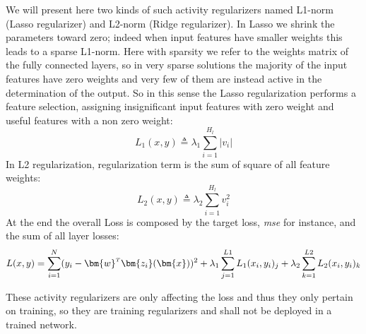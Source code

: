 We will present here two kinds of such activity regularizers named L1-norm (Lasso regularizer) and L2-norm (Ridge regularizer).
In Lasso we shrink the parameters toward zero; indeed when input features have smaller weights this leads to a sparse L1-norm. Here with sparsity we refer to the weights matrix of the fully connected layers, so in very sparse solutions the majority of the input features have zero weights and very few of them are instead active in the determination of the output.
So in this sense the Lasso regularization performs a feature selection, assigning insignificant input features with zero weight and useful features with a non zero weight:
\begin{equation}
    L_1(x,y) \triangleq \lambda_1 \sum_{i=1}^{H_l} \left| v_i \right|
\end{equation}
In L2 regularization, regularization term is the sum of square of all feature weights:
\begin{equation}
    L_2(x,y) \triangleq \lambda_2 \sum_{i=1}^{H_l} v_i^2
\end{equation}
At the end the overall Loss is composed by the target loss, \textit{mse} for instance, and the sum of all layer losses:
\begin{equation}
    L(x,y) = \sum_{i=1}^N (y_i - \transpose{\bm{w}}\bm{z_i}(\bm{x}))^2 + \lambda_1 \sum_{j=1}^{L1} L_1(x_i,y_i)_j + \lambda_2 \sum_{k=1}^{L2} L_2(x_i,y_i)_k
\end{equation}

These activity regularizers are only affecting the loss and thus they only pertain on training, so they are training regularizers and shall not be deployed in a trained network.




